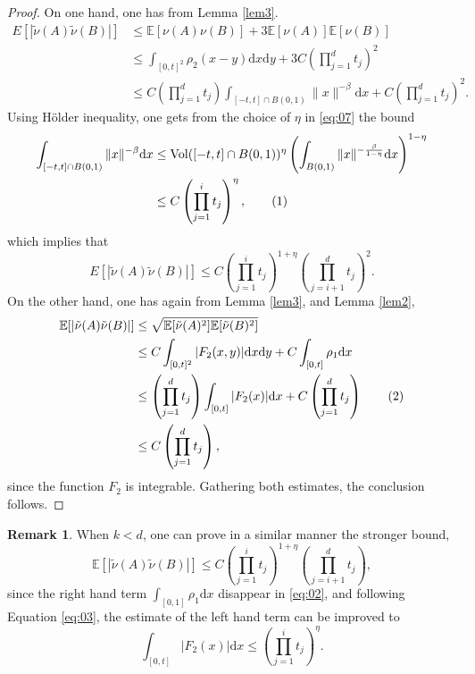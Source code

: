\documentclass[11pt,a4paper]{article}
\newcommand\E{\mathbb{E}}
\newcommand\dd{\mathrm{d}}
\newcommand\nut{\tilde{\nu}}
\DeclareMathOperator\Vol{Vol}
\newcommand\numberthis{\addtocounter{equation}{1}\tag{\theequation}}
\numberwithin{equation}{section}
\theoremstyle{plain}
\theoremstyle{plain}
\theoremstyle{plain}
\theoremstyle{plain}
\theoremstyle{definition}
\theoremstyle{definition}
\newtheorem{remark}[theo]{Remark}
\begin{document}
\begin{proof}
On one hand, one has from Lemma \ref{lem3}.
\begin{align*}
E[|\nut(A)\nut(B)|]&\leq \E[\nu(A)\nu(B)] + 3\E[\nu(A)]\E[\nu(B)]\\
&\leq \int_{[0,t]^2}\rho_2(x-y)\dd x\dd y + 3C\left(\prod_{j=1}^d t_j\right)^2\\
&\leq C\left(\prod_{j=1}^d t_j\right)\int_{[-t,t]\cap B(0,1)}\|x\|^{-\beta}\dd x + C\left(\prod_{j=1}^d t_j\right)^2.
\end{align*}
Using Hölder inequality, one gets from the choice of $\eta$ in \eqref{eq:07} the bound
\begin{align*}
\int_{[-t,t]\cap B(0,1)}\|x\|^{-\beta}\dd x&\leq \Vol([-t,t]\cap B(0,1))^{\eta}\left(\int_{B(0,1)}\|x\|^{-\frac{\beta}{1-\eta}}\dd x\right)^{1-\eta}\\
&\leq C\left(\prod_{j=1}^i t_j\right)^{\eta},\numberthis\label{eq:03}
\end{align*}
which implies that
\[E[|\nut(A)\nut(B)|]\leq C\left(\prod_{j=1}^i t_j\right)^{1+\eta}\left(\prod_{j=i+1}^d t_j\right)^2.\]
On the other hand, one has again from Lemma \ref{lem3}, and Lemma \ref{lem2},
\begin{align*}
\E[|\nut(A)\nut(B)|]&\leq \sqrt{\E[\nut(A)^2]\E[\nut(B)^2]}\\
&\leq C\int_{[0,t]^2}|F_2(x,y)|\dd x\dd y + C\int_{[0,t]}\rho_1\dd x\\
&\leq \left(\prod_{j=1}^d t_j\right)\int_{[0,t]}|F_2(x)|\dd x + C\left(\prod_{j=1}^d t_j\right)\numberthis\label{eq:02}\\
&\leq C\left(\prod_{j=1}^d t_j\right),
\end{align*}
since the function $F_2$ is integrable. Gathering both estimates, the conclusion follows.
\end{proof}
\begin{remark}
\label{rem1}
When $k<d$, one can prove in a similar manner the stronger bound,
\[\E[|\nut(A)\nut(B)|]\leq C\left(\prod_{j=1}^i t_j\right)^{1+\eta}\left(\prod_{j=i+1}^d t_j\right),\]
since the right hand term $\int_{[0,1]}\rho_1\dd x$ disappear in \eqref{eq:02}, and following Equation \eqref{eq:03}, the estimate of the left hand term can be improved to
\[\int_{[0,t]}|F_2(x)|\dd x\leq \left(\prod_{j=1}^i t_j\right)^\eta.\] 
\end{remark}
\end{document}
